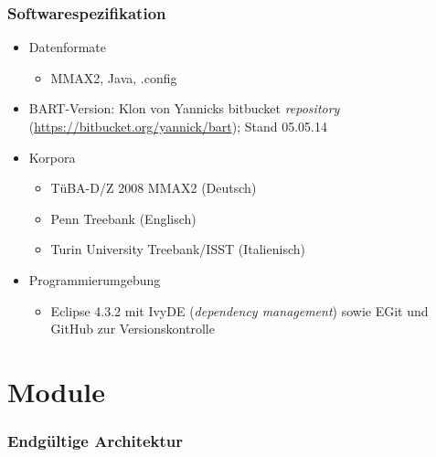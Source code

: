 \documentclass[11pt,a4paper]{beamer}
\begin{document}
\begin{frame}
\frametitle{Softwarespezifikation}

\begin{itemize}

	\item Datenformate
		\begin{itemize}
		\item MMAX2, Java, .config
	\end{itemize}
	\item BART-Version: Klon von Yannicks bitbucket \textit{repository} (\url{https://bitbucket.org/yannick/bart}); Stand 05.05.14 
	\item Korpora
	\begin{itemize}
		\item TüBA-D/Z 2008 MMAX2 (Deutsch)
		\item Penn Treebank (Englisch)
		\item Turin University Treebank/ISST (Italienisch)
	\end{itemize}
	\item Programmierumgebung
	\begin{itemize}
		\item Eclipse 4.3.2 mit IvyDE (\textit{dependency management}) sowie EGit und GitHub zur Versionskontrolle
	\end{itemize}

\end{itemize}

\end{frame}
\section{Module}

\begin{frame}
\frametitle{Endgültige Architektur}

\end{frame}
\end{document}
